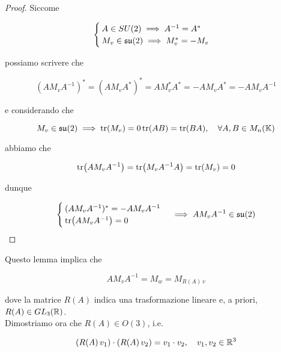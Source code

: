 \begin{proof}
	Siccome
	
	\begin{equation}
		\begin{cases}
			A \in SU(2) \implies A^{-1} = A^{*} \\
			M_{v} \in \mathfrak{su}(2) \implies M_{v}^{*} = - M_{v}
		\end{cases}
	\end{equation}

	possiamo scrivere che
	
	\begin{equation}
		(A M_{v} A^{-1})^{*} = (A M_{v} A^{*})^{*} %
		= A M_{v}^{*} A^{*} %
		= - A M_{v} A^{*} %
		= - A M_{v} A^{-1}
	\end{equation}

	e considerando che
	
	\begin{equation}
		M_{v} \in \su(2) \implies \tr(M_{v}) = 0 \\
		\tr(A B) = \tr(B A) \qcomma \forall A,B \in M_{n}(\K)
	\end{equation}
	
	abbiamo che
	
	\begin{equation}
		\tr(A M_{v} A^{-1}) = \tr(M_{v} A^{-1} A) %
		= \tr(M_{v}) %
		= 0
	\end{equation}

	dunque
	
	\begin{equation}
		\begin{cases}
			(A M_{v} A^{-1})^{*} = - A M_{v} A^{-1} \\
			\tr(A M_{v} A^{-1}) = 0
		\end{cases}
		\implies %
		A M_{v} A^{-1} \in \su(2)
	\end{equation}
\end{proof}

Questo lemma implica che

\begin{equation}
	A M_{v} A^{-1} = M_{w} = M_{R(A) \, v}
\end{equation}

dove la matrice $ R(A) $ indica una trasformazione lineare e, a priori, $ R(A) \in GL_{3}(\mathbb{R}) $.\\
Dimostriamo ora che $ R(A) \in O(3) $, i.e.

\begin{equation}
	(R(A) \, v_{1}) \cdot (R(A) \, v_{2}) = v_{1} \cdot v_{2} \qcomma v_{1},v_{2} \in \R^{3}
\end{equation}

